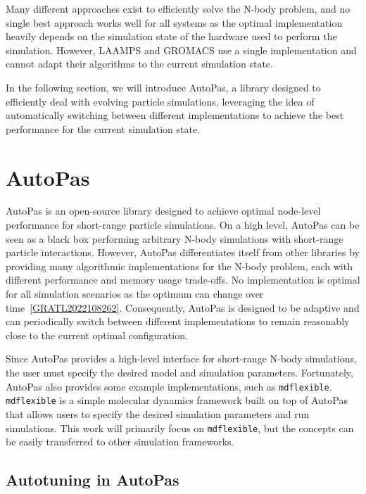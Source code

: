 Many different approaches exist to efficiently solve the N-body problem, and no single best approach works well for all systems as the optimal implementation heavily depends on the simulation state of the hardware used to perform the simulation. However, LAAMPS and GROMACS use a single implementation and cannot adapt their algorithms to the current simulation state.

In the following section, we will introduce AutoPas, a library designed to efficiently deal with evolving particle simulations, leveraging the idea of automatically switching between different implementations to achieve the best performance for the current simulation state.

\section{AutoPas}

AutoPas is an open-source library designed to achieve optimal node-level performance for short-range particle simulations. On a high level, AutoPas can be seen as a black box performing arbitrary N-body simulations with short-range particle interactions. However, AutoPas differentiates itself from other libraries by providing many algorithmic implementations for the N-body problem, each with different performance and memory usage trade-offs. No implementation is optimal for all simulation scenarios as the optimum can change over time~\autoref{GRATL2022108262}. Consequently, AutoPas is designed to be adaptive and can periodically switch between different implementations to remain reasonably close to the current optimal configuration.

Since AutoPas provides a high-level interface for short-range N-body simulations, the user must specify the desired model and simulation parameters. Fortunately, AutoPas also provides some example implementations, such as \texttt{\gls{mdflexible}}. \texttt{\gls{mdflexible}} is a simple molecular dynamics framework built on top of AutoPas that allows users to specify the desired simulation parameters and run simulations. This work will primarily focus on \texttt{\gls{mdflexible}}, but the concepts can be easily transferred to other simulation frameworks.

\subsection{Autotuning in AutoPas}

